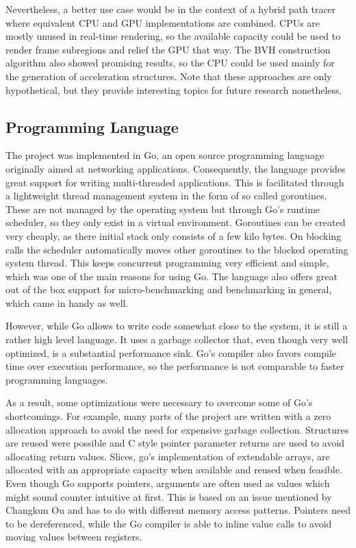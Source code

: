 Nevertheless, a better use case would be in the context of a hybrid path tracer where equivalent CPU and GPU implementations are combined. CPUs are mostly unused in real-time rendering, so the available capacity could be used to render frame subregions and relief the GPU that way. The BVH construction algorithm also showed promising results, so the CPU could be used mainly for the generation of acceleration structures. Note that these approaches are only hypothetical, but they provide interesting topics for future research nonetheless. 
\subsection{Programming Language}
\label{programming_lang}
The project was implemented in Go, an open source programming language originally aimed at networking applications. Consequently, the language provides great support for writing multi-threaded applications. This is facilitated through a lightweight thread management system in the form of so called goroutines\cite{Deshpande2012AnalysisOT}. These are not managed by the operating system but through Go's runtime scheduler, so they only exist in a virtual environment. Goroutines can be created very cheaply, as there initial stack only consists of a few kilo bytes. On blocking calls the scheduler automatically moves other goroutines to the blocked operating system thread. This keeps concurrent programming very efficient and simple, which was one of the main reasons for using Go. The language also offers great out of the box support for micro-benchmarking and benchmarking in general, which came in handy as well. 

However, while Go allows to write code somewhat close to the system, it is still a rather high level language. It uses a garbage collector that, even though very well optimized, is a substantial performance sink. Go's compiler also favors compile time over execution performance, so the performance is not comparable to faster programming languages. 

As a result, some optimizations were necessary to overcome some of Go's shortcomings. For example, many parts of the project are written with a zero allocation approach to avoid the need for expensive garbage collection. Structures are reused were possible and C style pointer parameter returns are used to avoid allocating return values. Slices, go's implementation of extendable arrays, are allocated with an appropriate capacity when available and reused when feasible. Even though Go supports pointers, arguments are often used as values which might sound counter intuitive at first. This is based on an issue mentioned by Changkun Ou\cite{ou20pointer} and has to do with different memory access patterns. Pointers need to be dereferenced, while the Go compiler is able to inline value calls to avoid moving values between registers. 

